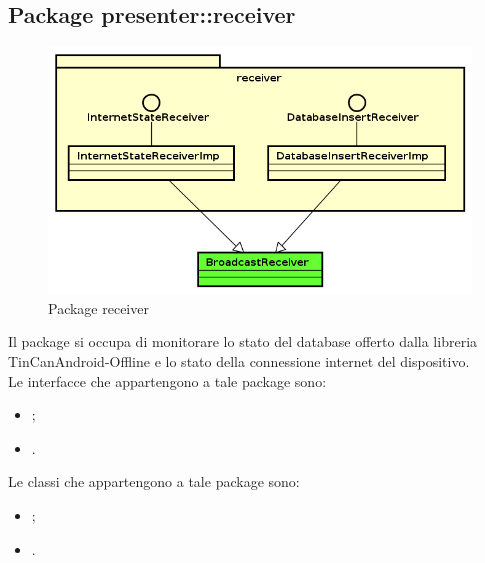 \documentclass[../Tesi.tex]{subfiles}
\begin{document}
	\subsection{Package presenter::receiver}
		\begin{figure}[H]
			\centering
			\includegraphics[scale=0.6]{images/package_diagrams/receiver}
				\caption{Package receiver}
			\label{fig:StrutturaMVP}
		\end{figure}
		Il package  si occupa di monitorare lo stato del database offerto dalla libreria TinCanAndroid-Offline e lo stato della connessione internet del dispositivo. \\
		Le interfacce che appartengono a tale package sono:
		\begin{itemize}
			\item {};
			\item {}.
		\end{itemize}
		Le classi che appartengono a tale package sono:
		\begin{itemize}
			\item {};
			\item {}.
		\end{itemize}
\end{document}
